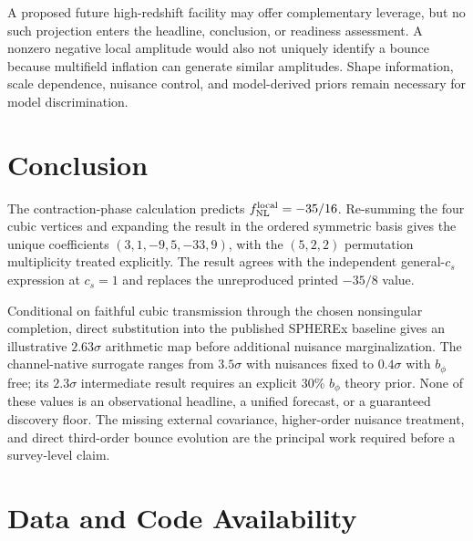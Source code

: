 \documentclass[aps,prd,twocolumn,superscriptaddress,showpacs,preprintnumbers,nofootinbib,longbibliography,floatfix]{revtex4-2}
\newcommand{\fnl}{f_{\rm NL}}
\begin{document}
A proposed future high-redshift facility may offer complementary leverage, but no such projection enters the headline, conclusion, or readiness assessment. A nonzero negative local amplitude would also not uniquely identify a bounce because multifield inflation can generate similar amplitudes. Shape information, scale dependence, nuisance control, and model-derived priors remain necessary for model discrimination.
\section{Conclusion}
\label{sec:conclusion}

The contraction-phase calculation predicts $\fnl^{\rm local}=-35/16$. Re-summing the four cubic vertices and expanding the result in the ordered symmetric basis gives the unique coefficients $(3,1,-9,5,-33,9)$, with the $(5,2,2)$ permutation multiplicity treated explicitly. The result agrees with the independent general-$c_s$ expression at $c_s=1$ and replaces the unreproduced printed $-35/8$ value.

Conditional on faithful cubic transmission through the chosen nonsingular completion, direct substitution into the published SPHEREx baseline gives an illustrative $2.63\sigma$ arithmetic map before additional nuisance marginalization. The channel-native surrogate ranges from $3.5\sigma$ with nuisances fixed to $0.4\sigma$ with $b_\phi$ free; its $2.3\sigma$ intermediate result requires an explicit 30\% $b_\phi$ theory prior. None of these values is an observational headline, a unified forecast, or a guaranteed discovery floor. The missing external covariance, higher-order nuisance treatment, and direct third-order bounce evolution are the principal work required before a survey-level claim.

\section*{Data and Code Availability}
\end{document}
